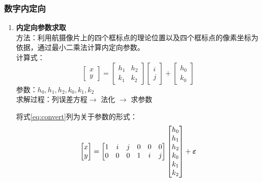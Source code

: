 \subsubsection{数字内定向}

\begin{enumerate}
\item \textbf{内定向参数求取}\\
方法：利用航摄像片上的四个框标点的理论位置以及四个框标点的像素坐标为依据，通过最小二乘法计算内定向参数。\\
计算式：
\begin{equation}
\begin{bmatrix}
x \\ y
\end{bmatrix}
=\begin{bmatrix}
h_1 & h_2 \\
k_1 & k_2 
\end{bmatrix}
\begin{bmatrix}
i \\ j
\end{bmatrix}
+\begin{bmatrix}
h_0 \\ k_0
\end{bmatrix}
\label{eq:convert}
\end{equation}
参数：$h_0,h_1,h_2,k_0,k_1,k_2$ \\
求解过程：列误差方程$\rightarrow$ 法化 $\rightarrow$ 求参数
\begin{solution}
将式\ref{eq:convert}列为关于参数的形式：
\begin{equation}
\begin{bmatrix}
x \\ y 
\end{bmatrix}
=
\begin{bmatrix}
1 & i & j & 0 & 0 & 0\\
0 & 0 & 0 & 1 & i & j
\end{bmatrix}
\begin{bmatrix}
h_0 \\ h_1 \\ h_2 \\ k_0 \\ k_1 \\ k_2
\end{bmatrix}
+\boldsymbol{\varepsilon}
\label{eq:erroreq}
\end{equation}


\end{solution}
\end{enumerate}
